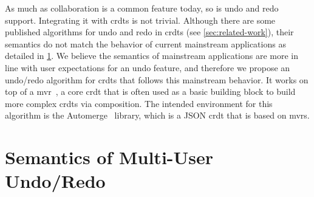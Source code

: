 \documentclass[sigplan,10pt]{acmart}
\begin{document}
As much as collaboration is a common feature today, so is undo and redo support.
Integrating it with \glspl*{crdt} is not trivial.
Although there are some published algorithms for undo and redo in \glspl*{crdt}
(see \cref{sec:related-work}),
their semantics do not match the behavior of current mainstream applications
as detailed in \cref{sec:semantics}.
We believe the semantics of mainstream applications are more in line with
user expectations for an undo feature, and therefore we propose an undo/redo
algorithm for \glspl{crdt} that follows this mainstream behavior.
It works on top of a \gls*{mvr}~\cite{shapiro2011comprehensive},
a core \gls*{crdt} that is often used as a basic
building block to build more complex \glspl*{crdt} via composition.
The intended environment for this algorithm is the Automerge~\cite{automerge} library,
which is a JSON \gls*{crdt} that is based on \glspl*{mvr}.

\section{Semantics of Multi-User Undo/Redo}\label{sec:semantics}
\end{document}
